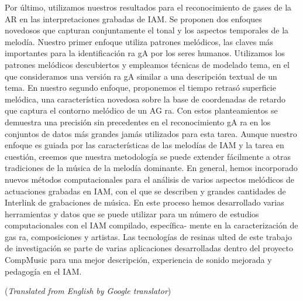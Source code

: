 Por último, utilizamos nuestros resultados para el reconocimiento de gases de la AR en las interpretaciones grabadas de IAM. Se proponen dos enfoques novedosos que capturan conjuntamente el tonal y los aspectos temporales de la melodía. Nuestro primer enfoque utiliza patrones melódicos, las claves más importantes para la identificación ra gA por los seres humanos. Utilizamos los patrones melódicos descubiertos y empleamos técnicas de modelado tema, en el que consideramos una versión ra gA similar a una
descripción textual de un tema. En nuestro segundo enfoque, proponemos el tiempo retrasó superficie melódica, una característica novedosa sobre la base de coordenadas de retardo que captura el contorno melódico de un AG ra. Con estos planteamientos se demuestra una precisión sin precedentes en el reconocimiento gA ra en los conjuntos de datos más grandes jamás utilizados para esta tarea. Aunque nuestro enfoque es guiada por las características de las melodías de IAM y la tarea en cuestión, creemos que nuestra metodología se puede extender fácilmente a otras tradiciones de la música de la melodía dominante.
En general, hemos incorporado nuevos métodos computacionales para el análisis de varios aspectos melódicos de actuaciones grabadas en IAM, con el que se describen y grandes cantidades de Interlink de grabaciones de música. En este proceso hemos desarrollado varias herramientas y datos que se puede utilizar para un número de estudios computacionales con el IAM compilado, específica- mente en la caracterización de gas ra, composiciones y artistas. Las tecnologías de resinas ulted de este trabajo de investigación se parte de varias aplicaciones desarrolladas dentro del proyecto CompMusic para una mejor descripción, experiencia de sonido mejorada y pedagogía en el IAM.

\vfill
{\small \noindent (\emph{Translated from English by Google translator})}